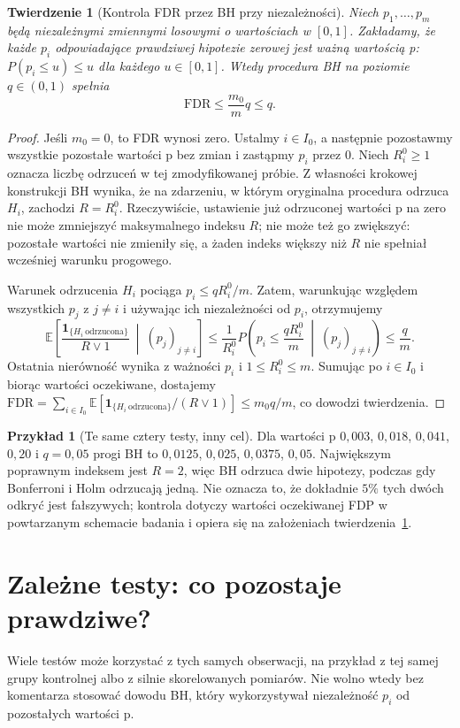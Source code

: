 \documentclass[11pt,a4paper,oneside]{report}
\numberwithin{equation}{chapter}
\theoremstyle{plain}
\newtheorem{twierdzenie}{Twierdzenie}[chapter]
\theoremstyle{definition}
\newtheorem{przyklad}{Przykład}[chapter]
\theoremstyle{remark}
\newcommand{\E}{\mathbb E}
\newcommand{\ind}[1]{\mathbf 1_{#1}}
\begin{document}
\begin{twierdzenie}[Kontrola FDR przez BH przy niezależności]
\label{thm:bh}
Niech $p_1,\ldots,p_m$ będą niezależnymi zmiennymi
losowymi o wartościach w $[0,1]$. Zakładamy, że
każde $p_i$ odpowiadające prawdziwej hipotezie zerowej
jest ważną wartością p:
$P(p_i\le u)\le u$ dla każdego $u\in[0,1]$.
Wtedy procedura BH na poziomie $q\in(0,1)$ spełnia
\[
 \mathrm{FDR}\le\frac{m_0}{m}q\le q.
\]
\end{twierdzenie}
\begin{proof}
Jeśli $m_0=0$, to FDR wynosi zero. Ustalmy
$i\in I_0$, a następnie pozostawmy wszystkie pozostałe
wartości p bez zmian i zastąpmy $p_i$ przez $0$.
Niech $R_i^0\ge1$ oznacza liczbę odrzuceń w tej
zmodyfikowanej próbie. Z własności krokowej konstrukcji
BH wynika, że na zdarzeniu, w którym oryginalna
procedura odrzuca $H_i$, zachodzi $R=R_i^0$.
Rzeczywiście, ustawienie już odrzuconej wartości p na
zero nie może zmniejszyć maksymalnego indeksu $R$;
nie może też go zwiększyć: pozostałe wartości nie
zmieniły się, a żaden indeks większy niż $R$ nie
spełniał wcześniej warunku progowego.

Warunek odrzucenia $H_i$ pociąga
$p_i\le qR_i^0/m$. Zatem, warunkując względem
wszystkich $p_j$ z $j\ne i$ i używając ich
niezależności od $p_i$, otrzymujemy
\[
 \E\left[\frac{\ind{\{H_i\ \text{odrzucona}\}}}{R\vee1}
 \ \middle|\ (p_j)_{j\ne i}\right]
 \le\frac1{R_i^0}P\left(p_i\le\frac{qR_i^0}{m}
 \ \middle|\ (p_j)_{j\ne i}\right)
 \le\frac q m.
\]
Ostatnia nierówność wynika z ważności $p_i$ i
$1\le R_i^0\le m$. Sumując po $i\in I_0$
i biorąc wartości oczekiwane, dostajemy
$\mathrm{FDR}=\sum_{i\in I_0}
\E[\ind{\{H_i\ \text{odrzucona}\}}/(R\vee1)]
\le m_0q/m$, co dowodzi twierdzenia.
\end{proof}

\begin{przyklad}[Te same cztery testy, inny cel]
Dla wartości p $0{,}003$, $0{,}018$, $0{,}041$, $0{,}20$
i $q=0{,}05$ progi BH to
$0{,}0125$, $0{,}025$, $0{,}0375$, $0{,}05$.
Największym poprawnym indeksem jest $R=2$, więc BH
odrzuca dwie hipotezy, podczas gdy Bonferroni i Holm
odrzucają jedną. Nie oznacza to, że dokładnie
$5\%$ tych dwóch odkryć jest fałszywych; kontrola
dotyczy wartości oczekiwanej FDP w powtarzanym
schemacie badania i opiera się na założeniach
twierdzenia~\ref{thm:bh}.
\end{przyklad}

\section{Zależne testy: co pozostaje prawdziwe?}
Wiele testów może korzystać z tych samych obserwacji,
na przykład z tej samej grupy kontrolnej albo z silnie
skorelowanych pomiarów. Nie wolno wtedy bez komentarza
stosować dowodu BH, który wykorzystywał niezależność
$p_i$ od pozostałych wartości p.
\end{document}
